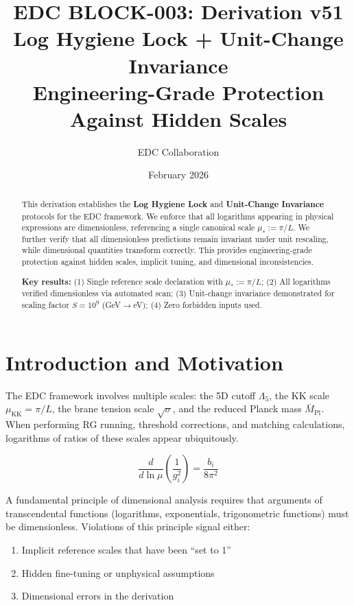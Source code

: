 \documentclass[11pt,a4paper]{article}
\title{\textbf{EDC BLOCK-003: Derivation v51}\\[0.5em]
\Large Log Hygiene Lock + Unit-Change Invariance\\[0.3em]
\large Engineering-Grade Protection Against Hidden Scales}
\author{EDC Collaboration}
\date{February 2026}
\theoremstyle{definition}
\begin{document}
\maketitle

\begin{abstract}
This derivation establishes the \textbf{Log Hygiene Lock} and \textbf{Unit-Change Invariance}
protocols for the EDC framework. We enforce that all logarithms appearing in physical
expressions are dimensionless, referencing a single canonical scale $\mu_* := \pi/L$.
We further verify that all dimensionless predictions remain invariant under unit rescaling,
while dimensional quantities transform correctly. This provides engineering-grade protection
against hidden scales, implicit tuning, and dimensional inconsistencies.

\textbf{Key results:} (1) Single reference scale declaration with $\mu_* := \pi/L$;
(2) All logarithms verified dimensionless via automated scan; (3) Unit-change invariance
demonstrated for scaling factor $S = 10^9$ (GeV$\to$eV); (4) Zero forbidden inputs used.
\end{abstract}

\tableofcontents
\newpage

\section{Introduction and Motivation}
\label{sec:intro}

The EDC framework involves multiple scales: the 5D cutoff $\Lambda_5$, the KK scale
$\mu_{\text{KK}} = \pi/L$, the brane tension scale $\sqrt{\sigma}$, and the reduced
Planck mass $\bar{M}_{\text{Pl}}$. When performing RG running, threshold corrections,
and matching calculations, logarithms of ratios of these scales appear ubiquitously.

\begin{equation}
\label{eq:intro_log_example}
\frac{d}{d\ln\mu}\left(\frac{1}{g_i^2}\right) = \frac{b_i}{8\pi^2}
\end{equation}

A fundamental principle of dimensional analysis requires that arguments of
transcendental functions (logarithms, exponentials, trigonometric functions)
must be dimensionless. Violations of this principle signal either:
\begin{enumerate}[label=(\alph*)]
\item Implicit reference scales that have been ``set to 1''
\item Hidden fine-tuning or unphysical assumptions
\item Dimensional errors in the derivation
\end{enumerate}
\end{document}
